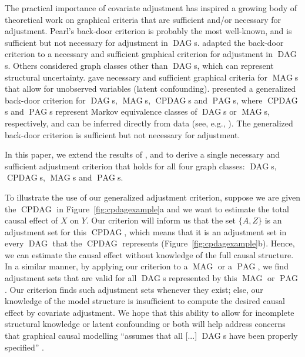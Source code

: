 \documentclass[]{article}
\DeclareMathOperator{\CPDAG}{CPDAG}
\DeclareMathOperator{\DAG}{DAG}
\DeclareMathOperator{\MAG}{MAG}
\DeclareMathOperator{\PAG}{PAG}
\theoremstyle{definition}
\theoremstyle{remark}
\begin{document}
The practical importance of covariate adjustment has inspired
a growing body of theoretical work on graphical criteria that are sufficient and/or necessary for adjustment.
Pearl's back-door criterion \citep{pearl1993bayesian} is probably the most well-known, and is
sufficient but not necessary for adjustment in $\DAG$s.
\citet{shpitser2012validity} adapted the back-door criterion to a necessary and sufficient graphical criterion
for adjustment in $\DAG$s.
Others considered graph classes other than
$\DAG$s, which can represent structural uncertainty.
\citet{vanconstructing} gave necessary and sufficient graphical criteria for $\MAG$s that allow for unobserved variables (latent confounding). \citet{maathuis2013generalized}
presented a generalized back-door criterion for $\DAG$s, $\MAG$s, $\CPDAG$s and $\PAG$s,
where $\CPDAG$s and $\PAG$s represent Markov equivalence classes of $\DAG$s or $\MAG$s, respectively,
and can be inferred directly from data (see, e.g., \citealp{spirtes2000causation, Chickering03, Colombo2012, ClaassenMooijHeskes13, colombo2014order}). The generalized back-door criterion is sufficient but not necessary for adjustment.

In this paper, we extend the results of
\citet{shpitser2012validity}, \citet{vanconstructing} and \citet{maathuis2013generalized} to derive a single necessary and sufficient adjustment criterion that holds for all four graph classes: $\DAG$s,
$\CPDAG$s, $\MAG$s and $\PAG$s.

To illustrate the use of our generalized adjustment
criterion, suppose we are given the $\CPDAG$
in Figure~\ref{fig:cpdagexample}a and we want to
estimate the total causal effect of $X$ on $Y$.
Our criterion will inform us that the set $\{A,Z\}$ is an
adjustment set for this $\CPDAG$, which means that it
is an adjustment set in every $\DAG$ that the $\CPDAG$
represents (Figure~\ref{fig:cpdagexample}b). Hence, we can estimate the causal
effect without knowledge of the full causal structure.
In a similar manner, by applying our criterion to a $\MAG$
or a $\PAG$, we find adjustment sets that are
valid for all $\DAG$s represented by this $\MAG$ or $\PAG$.
Our criterion finds such
adjustment sets whenever they exist;
else, our knowledge of
the model structure is insufficient to compute the
desired causal effect by covariate adjustment.
We hope that this ability to allow for incomplete
structural knowledge or latent confounding or
both will help address concerns
that graphical causal modelling ``assumes that all [...] $\DAG$s
have been properly specified'' \citep{West2014}.
\end{document}
